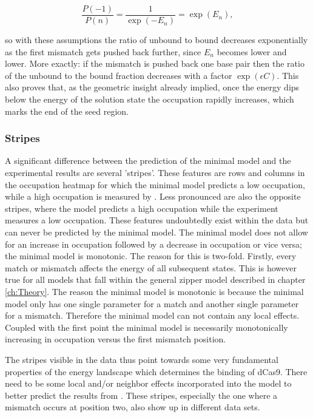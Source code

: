 \begin{equation}
\frac{P(-1)}{P(n)} = \frac{1}{\exp(-E_n)} = \exp(E_n),
\end{equation}

so with these assumptions the ratio of unbound to bound decreases exponentially as the first mismatch gets pushed back further, since $E_n$ becomes lower and lower. More exactly: if the mismatch is pushed back one base pair then the ratio of the unbound to the bound fraction decreases with a factor $\exp(\epsilon C)$. %
This also proves that, as the geometric insight already implied, once the energy dips below the energy of the solution state the occupation rapidly increases, which marks the end of the seed region.


\subsubsection{Stripes}

A significant difference between the prediction of the minimal model and the experimental results are several 'stripes'. These features are rows and columns in the occupation heatmap for which the minimal model predicts a low occupation, while a high occupation is measured by \cite{PNAS}. Less pronounced are also the opposite stripes, where the model predicts a high occupation while the experiment measures a low occupation. These features undoubtedly exist within the data but can never be predicted by the minimal model. The minimal model does not allow for an increase in occupation followed by a decrease in occupation or vice versa; the minimal model is monotonic. The reason for this is two-fold. Firstly, every match or mismatch affects the energy of all subsequent states. This is however true for all models that fall within the general zipper model described in chapter \ref{ch:Theory}. The reason the minimal model is monotonic is because the minimal model only has one single parameter for a match and another single parameter for a mismatch. Therefore the minimal model can not contain any local effects. Coupled with the first point the minimal model is necessarily monotonically increasing in occupation versus the first mismatch position.

The stripes visible in the data thus point towards some very fundamental properties of the energy landscape which determines the binding of dCas9. There need to be some local and/or neighbor effects incorporated into the model to better predict the results from \cite{PNAS}. These stripes, especially the one where a mismatch occurs at position two, also show up in different data sets. %

